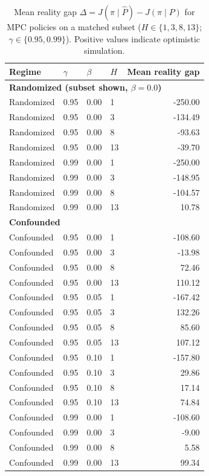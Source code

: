 \documentclass[11pt]{article}
\newcommand{\wm}{\hat{P}}
\newcommand{\gt}{P}
\begin{document}
\begin{table}[t]
\centering
\caption{Mean reality gap $\Delta = J(\pi\mid\wm) - J(\pi\mid\gt)$ for MPC policies on a matched subset ($H\in\{1,3,8,13\}$; $\gamma\in\{0.95,0.99\}$). Positive values indicate optimistic simulation.}
\label{tab:gap}
\begin{tabular}{@{}llllr@{}}
\toprule
Regime & $\gamma$ & $\beta$ & $H$ & Mean reality gap \\ \midrule
\multicolumn{5}{l}{\textbf{Randomized (subset shown, $\beta=0.0$)}}\\
Randomized & 0.95 & 0.00 & 1  & -250.00\\
Randomized & 0.95 & 0.00 & 3  & -134.49\\
Randomized & 0.95 & 0.00 & 8  &  -93.63\\
Randomized & 0.95 & 0.00 & 13 &  -39.70\\
Randomized & 0.99 & 0.00 & 1  & -250.00\\
Randomized & 0.99 & 0.00 & 3  & -148.95\\
Randomized & 0.99 & 0.00 & 8  & -104.57\\
Randomized & 0.99 & 0.00 & 13 &   10.78\\ \midrule
\multicolumn{5}{l}{\textbf{Confounded}}\\
Confounded & 0.95 & 0.00 & 1  & -108.60\\
Confounded & 0.95 & 0.00 & 3  &  -13.98\\
Confounded & 0.95 & 0.00 & 8  &   72.46\\
Confounded & 0.95 & 0.00 & 13 &  110.12\\
Confounded & 0.95 & 0.05 & 1  & -167.42\\
Confounded & 0.95 & 0.05 & 3  &  132.26\\
Confounded & 0.95 & 0.05 & 8  &   85.60\\
Confounded & 0.95 & 0.05 & 13 &  107.12\\
Confounded & 0.95 & 0.10 & 1  & -157.80\\
Confounded & 0.95 & 0.10 & 3  &   29.86\\
Confounded & 0.95 & 0.10 & 8  &   17.14\\
Confounded & 0.95 & 0.10 & 13 &   74.84\\
Confounded & 0.99 & 0.00 & 1  & -108.60\\
Confounded & 0.99 & 0.00 & 3  &   -9.00\\
Confounded & 0.99 & 0.00 & 8  &    5.58\\
Confounded & 0.99 & 0.00 & 13 &   99.34\\

\end{tabular}
\end{table}
\end{document}

